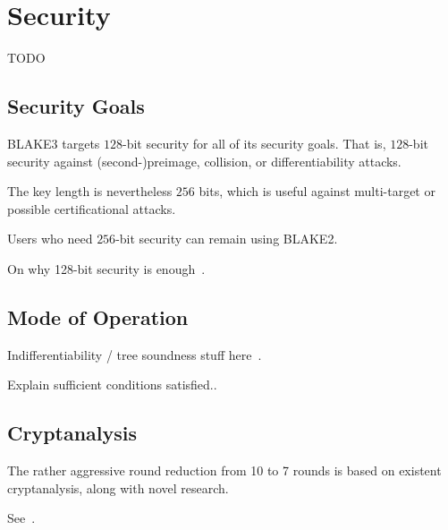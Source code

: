 \documentclass[11pt,notitlepage,a4paper]{article}
\begin{document}
\section{Security}\label{sec:security}

TODO

\subsection{Security Goals}\label{sec:goals}

BLAKE3 targets $128$-bit security for all of its security goals. That is, $128$-bit security against (second-)preimage, collision, or differentiability attacks.

The key length is nevertheless $256$ bits, which is useful against multi-target or possible certificational attacks.

Users who need $256$-bit security can remain using BLAKE2.

On why 128-bit security is enough~\cite{TMC}.

\subsection{Mode of Operation}\label{sec:mode}

Indifferentiability / tree soundness stuff here~\cite{DBLP:journals/ijisec/BertoniDPA14,DBLP:journals/tosc/LuykxMN16,DBLP:journals/tosc/DaemenMA18}.

Explain sufficient conditions satisfied..

\subsection{Cryptanalysis}\label{sec:cryptanalysis}

The rather aggressive round reduction from 10 to 7 rounds is based on existent cryptanalysis, along with novel research.

See~\cite{TMC}.
\end{document}
